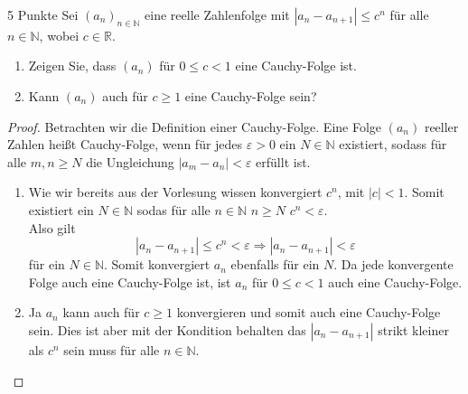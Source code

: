 \documentclass{problemset}
\begin{document}
\begin{problem}{5 Punkte}
Sei $(a_n)_{n\in\mathbb{N}}$ eine reelle Zahlenfolge mit $|a_n - a_{n+1}| \leq c^n$ für alle $n \in \mathbb{N}$, wobei $c \in \mathbb{R}$.
\begin{enumerate}
	\item Zeigen Sie, dass $(a_n)$ für $0 \leq c < 1$ eine Cauchy-Folge ist.
	\item Kann $(a_n)$ auch für $c \geq 1$ eine Cauchy-Folge sein?
\end{enumerate}
\begin{proof}
	Betrachten wir die Definition einer Cauchy-Folge.
	Eine Folge $(a_n)$ reeller Zahlen heißt Cauchy-Folge, wenn für jedes $\varepsilon > 0$ ein $N \in \mathbb{N}$ existiert,
	sodass für alle $m, n \geq N$ die Ungleichung $|a_m - a_n| < \varepsilon$ erfüllt ist.

	\begin{enumerate}
		\item Wie wir bereits aus der Vorlesung wissen konvergiert $c^n$, mit $|c| < 1$.
		      Somit existiert ein $N \in \mathbb{N}$ sodas für alle $n \in \mathbb{N}$ $n \ge N$ $c^n < \varepsilon$. \\
		      Also gilt \[
			      |a_n - a_{n+1}| \leq c^n < \varepsilon \Longrightarrow |a_n - a_{n+1}| < \varepsilon
		      \] für ein $N \in \mathbb{N}$. Somit konvergiert $a_n$ ebenfalls für ein $N$.
		      Da jede konvergente Folge auch eine Cauchy-Folge ist, ist $a_n$ für $0 \leq c < 1$ auch eine Cauchy-Folge.
		\item Ja $a_n$ kann auch für $c \ge 1$ konvergieren und somit auch eine Cauchy-Folge sein.
		      Dies ist aber mit der Kondition behalten das $|a_n - a_{n+1}|$ strikt kleiner als $c^n$ sein muss für alle $n \in \mathbb{N}$.
	\end{enumerate}
\end{proof}

\end{problem}
\end{document}
